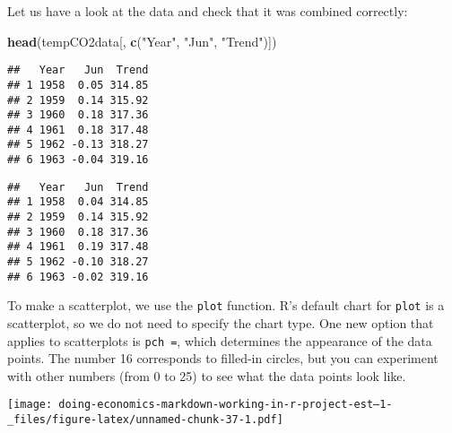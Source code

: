 \documentclass[
]{article}
\newenvironment{Shaded}{\begin{snugshade}}{\end{snugshade}}
\newcommand{\AttributeTok}[1]{\textcolor[rgb]{0.13,0.29,0.53}{#1}}
\newcommand{\DecValTok}[1]{\textcolor[rgb]{0.00,0.00,0.81}{#1}}
\newcommand{\FunctionTok}[1]{\textcolor[rgb]{0.13,0.29,0.53}{\textbf{#1}}}
\newcommand{\NormalTok}[1]{#1}
\newcommand{\SpecialCharTok}[1]{\textcolor[rgb]{0.81,0.36,0.00}{\textbf{#1}}}
\newcommand{\StringTok}[1]{\textcolor[rgb]{0.31,0.60,0.02}{#1}}
\begin{document}
Let us have a look at the data and check that it was combined correctly:

\begin{Shaded}
\begin{Highlighting}[]
\FunctionTok{head}\NormalTok{(tempCO2data[, }\FunctionTok{c}\NormalTok{(}\StringTok{"Year"}\NormalTok{, }\StringTok{"Jun"}\NormalTok{, }\StringTok{"Trend"}\NormalTok{)])}
\end{Highlighting}
\end{Shaded}

\begin{verbatim}
##   Year   Jun  Trend
## 1 1958  0.05 314.85
## 2 1959  0.14 315.92
## 3 1960  0.18 317.36
## 4 1961  0.18 317.48
## 5 1962 -0.13 318.27
## 6 1963 -0.04 319.16
\end{verbatim}

\begin{verbatim}
##   Year   Jun  Trend
## 1 1958  0.04 314.85
## 2 1959  0.14 315.92
## 3 1960  0.18 317.36
## 4 1961  0.19 317.48
## 5 1962 -0.10 318.27
## 6 1963 -0.02 319.16
\end{verbatim}

To make a scatterplot, we use the \texttt{plot} function. R's default
chart for \texttt{plot} is a scatterplot, so we do not need to specify
the chart type. One new option that applies to scatterplots is
\texttt{pch\ =}, which determines the appearance of the data points. The
number 16 corresponds to filled-in circles, but you can experiment with
other numbers (from 0 to 25) to see what the data points look like.

\begin{Shaded}
\end{Shaded}

\texttt{[image: doing-economics-markdown-working-in-r-project-est--1-\_files/figure-latex/unnamed-chunk-37-1.pdf]}
\end{document}
